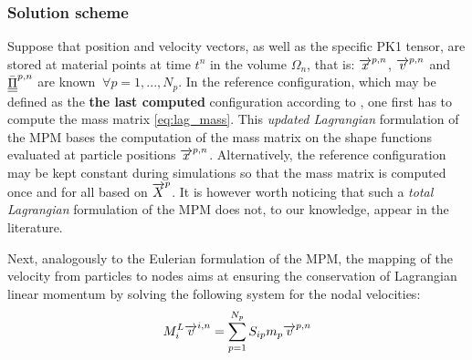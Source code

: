 \subsubsection*{Solution scheme}
Suppose that position and velocity vectors, as well as the specific PK1 tensor, are stored at material points at time $t^n$ in the volume $\Omega_n$, that is: ${\overrightarrow{x}}^{p,n}$, ${\overrightarrow{v}}^{p,n}$ and ${\underline{\underline{\bar{\Pi}}}}^{p,n}$ are known $\: \forall p=1,...,N_p$.
In the reference configuration, which may be defined as the \textbf{the last computed} configuration according to \cite{Love}, one first has to compute the mass matrix \eqref{eq:lag_mass}.
This \textit{updated Lagrangian} formulation of the MPM bases the computation of the mass matrix on the shape functions evaluated at particle positions ${\overrightarrow{x}}^{p,n}$.
Alternatively, the reference configuration may be kept constant during simulations so that the mass matrix is computed once and for all based on ${\overrightarrow{X}}^{p}$.
It is however worth noticing that such a \textit{total Lagrangian} formulation of the MPM does not, to our knowledge, appear in the literature.

Next, analogously to the Eulerian formulation of the MPM, the mapping of the velocity from particles to nodes aims at ensuring the conservation of Lagrangian linear momentum by solving the following system for the nodal velocities:
\begin{equation*}
  M^{L}_i {\overrightarrow{v}}^{i,n} = \sum_{p=1}^{N_p} S_{ip}m_p {\overrightarrow{v}}^{p,n}
\end{equation*}

